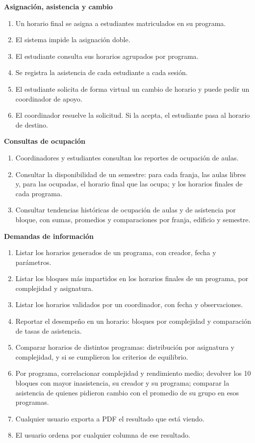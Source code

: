\textbf{Asignación, asistencia y cambio}
\begin{enumerate}[start=11]
  \item Un horario final se asigna a estudiantes matriculados en su programa.
  \item El sistema impide la asignación doble.
  \item El estudiante consulta sus horarios agrupados por programa.
  \item Se registra la asistencia de cada estudiante a cada sesión.
  \item El estudiante solicita de forma virtual un cambio de horario y puede pedir un coordinador de apoyo.
  \item El coordinador resuelve la solicitud. Si la acepta, el estudiante pasa al horario de destino.
\end{enumerate}

\textbf{Consultas de ocupación}
\begin{enumerate}[start=17]
  \item Coordinadores y estudiantes consultan los reportes de ocupación de aulas.
  \item Consultar la disponibilidad de un semestre: para cada franja, las aulas libres y, para las ocupadas, el horario final que las ocupa; y los horarios finales de cada programa.
  \item Consultar tendencias históricas de ocupación de aulas y de asistencia por bloque, con sumas, promedios y comparaciones por franja, edificio y semestre.
\end{enumerate}

\textbf{Demandas de información}
\begin{enumerate}[start=20]
  \item Listar los horarios generados de un programa, con creador, fecha y parámetros.
  \item Listar los bloques más impartidos en los horarios finales de un programa, por complejidad y asignatura.
  \item Listar los horarios validados por un coordinador, con fecha y observaciones.
  \item Reportar el desempeño en un horario: bloques por complejidad y comparación de tasas de asistencia.
  \item Comparar horarios de distintos programas: distribución por asignatura y complejidad, y si se cumplieron los criterios de equilibrio.
  \item Por programa, correlacionar complejidad y rendimiento medio; devolver los 10 bloques con mayor inasistencia, su creador y su programa; comparar la asistencia de quienes pidieron cambio con el promedio de su grupo en esos programas.
  \item Cualquier usuario exporta a PDF el resultado que está viendo.
  \item El usuario ordena por cualquier columna de ese resultado.
\end{enumerate}

